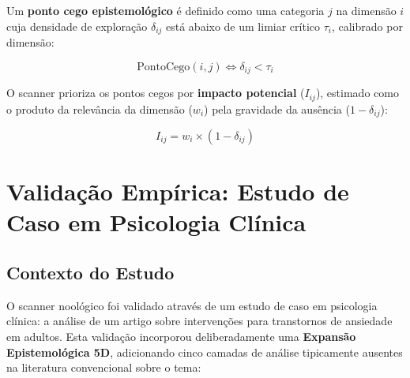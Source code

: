 Um \textbf{ponto cego epistemológico} é definido como uma categoria $j$ na dimensão $i$ cuja densidade de exploração $\delta_{ij}$ está abaixo de um limiar crítico $\tau_i$, calibrado por dimensão:

\[
\text{PontoCego}(i,j) \iff \delta_{ij} < \tau_i
\]

O scanner prioriza os pontos cegos por \textbf{impacto potencial} ($I_{ij}$), estimado como o produto da relevância da dimensão ($w_i$) pela gravidade da ausência ($1 - \delta_{ij}$):

\[
I_{ij} = w_i \times (1 - \delta_{ij})
\]

\section{Validação Empírica: Estudo de Caso em Psicologia Clínica}

\subsection{Contexto do Estudo}

O scanner noológico foi validado através de um estudo de caso em psicologia clínica: a análise de um artigo sobre intervenções para transtornos de ansiedade em adultos. Esta validação incorporou deliberadamente uma \textbf{Expansão Epistemológica 5D}, adicionando cinco camadas de análise tipicamente ausentes na literatura convencional sobre o tema:

